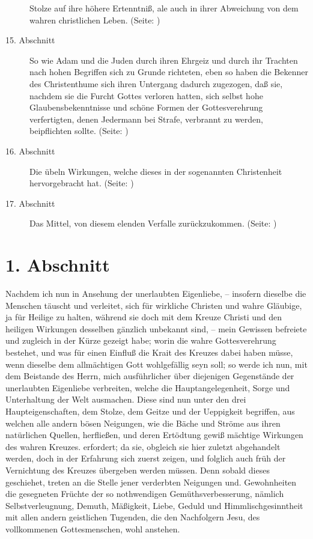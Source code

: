 \begin{description}
Stolze auf ihre höhere Ertenntniß, ale auch in ihrer Abweichung von dem wahren
christlichen Leben. (Seite: \pageref{kap7_ab14})
\item[15. Abschnitt] So wie Adam und die Juden durch ihren Ehrgeiz und durch ihr
Trachten nach hohen Begriffen sich zu Grunde richteten, eben so haben die
Bekenner des Christenthume sich ihren Untergang dadurch zugezogen, daß sie,
nachdem sie die Furcht Gottes verloren hatten, sich selbst hohe
Glaubensbekenntnisse und schöne Formen der Gottesverehrung verfertigten, denen
Jedermann bei Strafe, verbrannt zu werden, beipflichten sollte. (Seite: \pageref{kap7_ab15})
\item[16. Abschnitt] Die übeln Wirkungen, welche dieses in der sogenannten
Christenheit hervorgebracht hat. (Seite: \pageref{kap7_ab16})
\item[17. Abschnitt] Das Mittel, von diesem elenden Verfalle zurückzukommen. (Seite: \pageref{kap7_ab17})

\end{description}
\normalsize


\section{1. Abschnitt} \label{kap7_ab1}

Nachdem ich nun in Ansehung der unerlaubten Eigenliebe, -- insofern dieselbe die
Menschen täuscht und verleitet, sich für wirkliche Christen und wahre Gläubige,
ja für Heilige zu halten, während sie doch mit dem Kreuze Christi und den
heiligen Wirkungen desselben gänzlich unbekannt sind, -- mein Gewissen befreiete
und zugleich in der Kürze gezeigt habe; worin die wahre Gottesverehrung
bestehet, und was für einen Einfluß die Krait des Kreuzes dabei haben müsse,
wenn dieselbe dem allmächtigen Gott wohlgefällig seyn soll; so werde ich nun,
mit dem Beistande des Herrn, mich ausführlicher über diejenigen Gegenstände der
unerlaubten Eigenliebe verbreiten, welche die Hauptangelegenheit, Sorge und
Unterhaltung der Welt ausmachen. Diese sind nun unter den drei
Haupteigenschaften, dem Stolze, dem Geitze und der Ueppigkeit begriffen, aus
welchen alle andern bösen Neigungen, wie die Bäche und Ströme aus ihren
natürlichen Quellen, herfließen, und deren Ertödtung gewiß mächtige Wirkungen
des wahren Kreuzes. erfordert; da sie, obgleich sie hier zuletzt abgehandelt
werden, doch in der Erfahrung sich zuerst zeigen, und folglich auch früh der
Vernichtung des Kreuzes übergeben werden müssen. Denn sobald dieses geschiehet,
treten an die Stelle jener verderbten Neigungen und. Gewohnheiten die gesegneten
Früchte der so nothwendigen Gemüthsverbesserung, nämlich Selbstverleugnung,
Demuth, Mäßigkeit, Liebe, Geduld und Himmlischgesinntheit mit allen andern
geistlichen Tugenden, die den Nachfolgern Jesu, des vollkommenen Gottesmenschen,
wohl anstehen.


